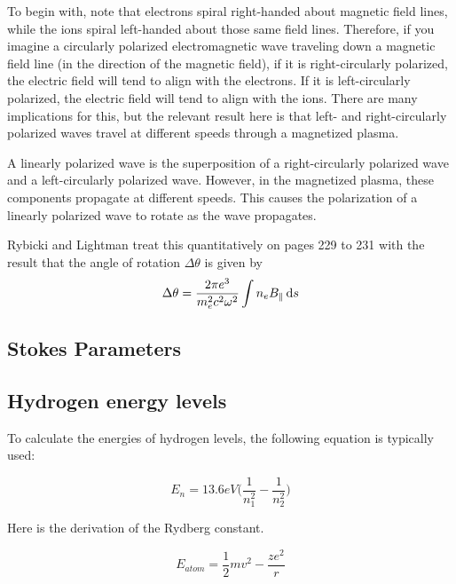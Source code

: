 To begin with, note that electrons spiral right-handed about
magnetic field lines, while the ions spiral left-handed about those same field lines.
Therefore, if you imagine a circularly polarized electromagnetic wave traveling down a
magnetic field line (in the direction of the magnetic field), if it is right-circularly polarized,
the electric field will tend to align with the electrons.  If it is left-circularly polarized,
the electric field will tend to align with the ions.  There are many implications for this,
but the relevant result here is that left- and right-circularly polarized waves travel at
different speeds through a magnetized plasma.

A linearly polarized wave is the superposition of a right-circularly polarized wave and a
left-circularly polarized wave.  However, in the magnetized plasma, these components propagate
at different speeds.  This causes the polarization of a linearly polarized wave to rotate as
the wave propagates.

Rybicki and Lightman treat this quantitatively on pages 229 to 231 with the result that the
angle of rotation $\Delta\theta$ is given by
\begin{dmath}
    \Delta\theta=\frac{2\pi e^3}{m_e^2c^2\omega^2}\int n_e B_\parallel\,\d s
\end{dmath}

\subsection{Stokes Parameters}

\subsection{Hydrogen energy levels}

To calculate the energies of hydrogen levels, the following equation is typically used:

\begin{equation}
E_n = 13.6eV\big(\frac{1}{n_1^2} - \frac{1}{n_2^2}\big)
\end{equation}

Here is the derivation of the Rydberg constant.

\begin{equation}
E_{atom} = \frac{1}{2}mv^2 - \frac{ze^2}{r}
\end{equation}


